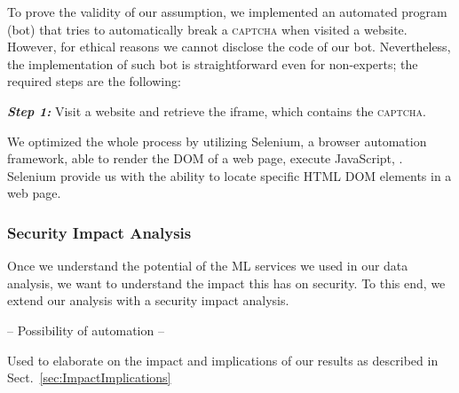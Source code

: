 \documentclass[sigconf,review,anonymous]{acmart}
\newcommand{\captcha}{\textsc{captcha}\xspace}
\begin{document}
To prove the validity of our assumption, we implemented an automated program (bot) that tries to automatically break a \captcha when visited a website. However, for ethical reasons we cannot disclose the code of our bot. Nevertheless, the implementation of such bot is straightforward even for non-experts; the required steps are the following:

\medskip \noindent \textbf{\emph{Step 1:}} Visit a website and retrieve the iframe, which contains the \captcha.

We optimized the whole process by utilizing Selenium, a browser automation framework, able to render the DOM of a web page, execute JavaScript, . Selenium provide us with the ability to locate specific HTML DOM elements in a web page.


\subsubsection{Security Impact Analysis}
Once we understand the potential of the ML services we used in our data analysis, we want to understand the impact this has on security. To this end, we extend our analysis with a security impact analysis. 

-- Possibility of automation --


Used to elaborate on the impact and implications of our results as described in Sect.~\ref{sec:ImpactImplications}

\end{document}
